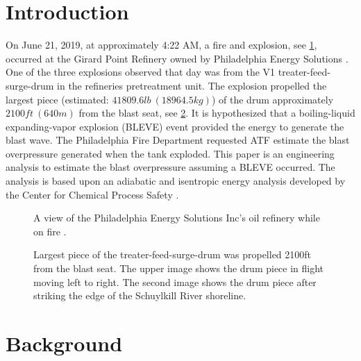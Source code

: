 \documentclass[10pt,parskip=half,
toc=sectionentrywithdots,
bibliography=totocnumbered,
captions=tableheading,numbers=noendperiod]{scrartcl}
\begin{document}
    \begingroup
    \let\cleardoublepage\relax
    \let\clearpage\relax\tableofcontents
    \endgroup

\hypertarget{introduction}{%
\section{Introduction}\label{introduction}}

On June 21, 2019, at approximately 4:22 AM, a fire and explosion, see
\cref{fig:fire}, occurred at the Girard Point Refinery owned by
Philadelphia Energy Solutions \cite{Renshaw2019}. One of the three
explosions observed that day was from the V1 treater-feed-surge-drum in
the refineries pretreatment unit. The explosion propelled the largest
piece (estimated: \(41809.6lb\:(18964.5kg)\)) of the drum approximately
\(2100ft\:(640m)\) from the blast seat, see \cref{fig:tank}. It is
hypothesized that a boiling-liquid expanding-vapor explosion (BLEVE)
event provided the energy to generate the blast wave. The Philadelphia
Fire Department requested ATF estimate the blast overpressure generated
when the tank exploded. This paper is an engineering analysis to
estimate the blast overpressure assuming a BLEVE occurred. The analysis
is based upon an adiabatic and isentropic energy analysis developed by
the Center for Chemical Process Safety \cite{Safety2010}.

\begin{figure}[H]
\hypertarget{fig:fire}{%
\begin{center}
\end{center}
\caption{A view of the Philadelphia Energy Solutions Inc's oil refinery while on
fire \cite{Maykuth2019}.}\label{fig:fire}
}
\end{figure}

    \begin{figure}[H]\begin{center}\end{center}\caption{Largest piece of the treater-feed-surge-drum was propelled 2100ft from
the blast seat. The upper image shows the drum piece in flight moving
left to right. The second image shows the drum piece after striking the
edge of the Schuylkill River shoreline.}\label{fig:tank}\end{figure}

\hypertarget{background}{%
\section{Background}\label{background}}
\end{document}
